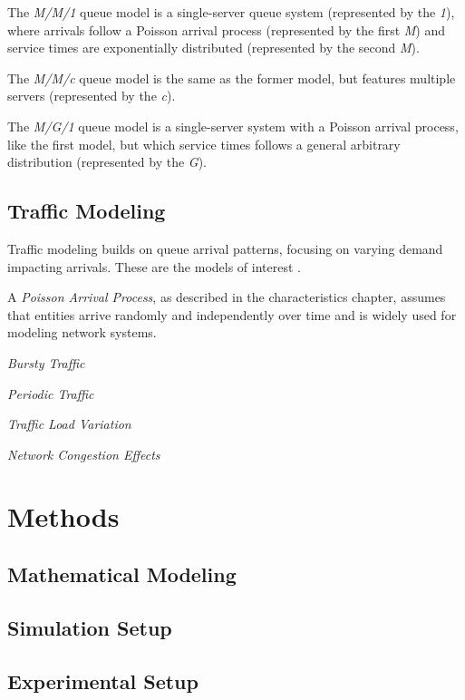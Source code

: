 \documentclass[a4paper,12pt]{article}
\begin{document}
        The \textit{M/M/1} queue model is a single-server queue system (represented by the \textit{1}), where arrivals follow a Poisson arrival process (represented by the first \textit{M}) and service times are exponentially distributed (represented by the second \textit{M}). 
        
        The \textit{M/M/c} queue model is the same as the former model, but features multiple servers (represented by the \textit{c}).
        
        The \textit{M/G/1} queue model is a single-server system with a Poisson arrival process, like the first model, but which service times follows a general arbitrary distribution (represented by the \textit{G}).
    
    \subsection{Traffic Modeling}
    Traffic modeling builds on queue arrival patterns, focusing on varying demand impacting arrivals. These are the models of interest \cite{ross2022}.

    A \textit{Poisson Arrival Process}, as described in the characteristics chapter, assumes that entities arrive randomly and independently over time and is widely used for modeling network systems.

    \textit{Bursty Traffic} 

    \textit{Periodic Traffic}

    \textit{Traffic Load Variation}

    \textit{Network Congestion Effects}

\section{Methods}

    \subsection{Mathematical Modeling}
    
    \subsection{Simulation Setup}
    
    \subsection{Experimental Setup}
\end{document}
